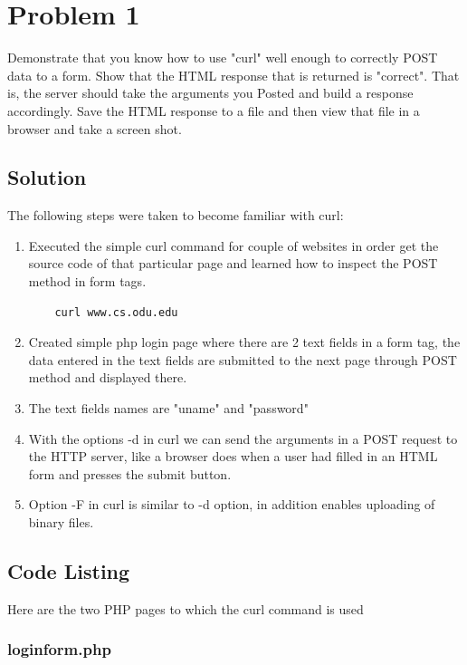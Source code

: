 


\section{Problem 1}
\label{part1}

Demonstrate that you know how to use "curl" well enough to
correctly POST data to a form.  Show that the HTML response that
is returned is "correct".  That is, the server should take the
arguments you Posted and build a response accordingly.  Save the
HTML response to a file and then view that file in a browser and
take a screen shot.

\subsection{Solution}

The following steps were taken to become familiar with curl:
\begin{enumerate}
	\item Executed the simple curl command for couple of websites in order get the source code of that particular page and learned how to inspect the POST method in form tags.
\begin{verbatim}
	curl www.cs.odu.edu	
\end{verbatim}
	\item Created simple php login page where there are 2 text fields in a form tag, the data entered in the text fields are submitted to the next page through POST method and displayed there. 
	\item The text fields names are "uname" and "password" 
	\item With the options -d in curl we can send the arguments in a POST request to the HTTP server, like a browser does when a user had filled in an HTML form and presses the submit button.
	\item Option -F in curl is similar to -d option, in addition enables  uploading of binary files. 
\end{enumerate}

\subsection{Code Listing}
Here are the two PHP pages to which the curl command is used 
\subsubsection{loginform.php}

\newpage
